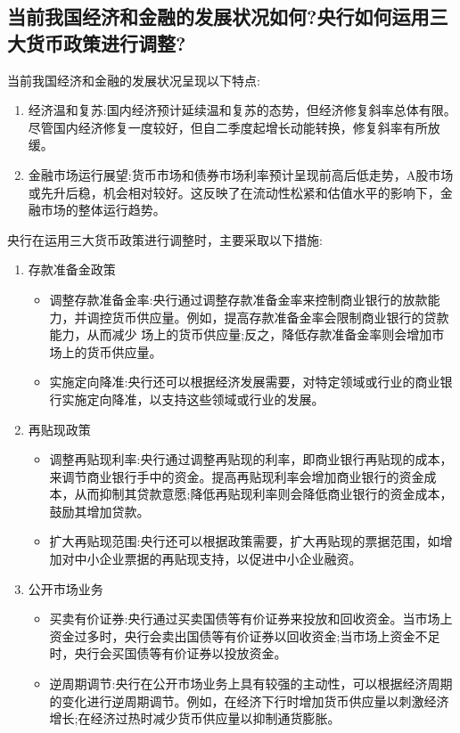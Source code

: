 \documentclass{article}
\begin{document}
\subsection{当前我国经济和金融的发展状况如何?央行如何运用三大货币政策进行调整?}

\noindent 当前我国经济和金融的发展状况呈现以下特点:
\begin{enumerate}
	\item 经济温和复苏:国内经济预计延续温和复苏的态势，但经济修复斜率总体有限。尽管国内经济修复一度较好，但自二季度起增长动能转换，修复斜率有所放缓。
	\item 金融市场运行展望:货币市场和债券市场利率预计呈现前高后低走势，A股市场或先升后稳，机会相对较好。这反映了在流动性松紧和估值水平的影响下，金融市场的整体运行趋势。
\end{enumerate}

\noindent 央行在运用三大货币政策进行调整时，主要采取以下措施:
\begin{enumerate}
	\item  存款准备金政策
	\begin{itemize}
		\item 调整存款准备金率:央行通过调整存款准备金率来控制商业银行的放款能力，并调控货币供应量。例如，提高存款准备金率会限制商业银行的贷款能力，从而减少 场上的货币供应量;反之，降低存款准备金率则会增加市场上的货币供应量。
    	\item 实施定向降准:央行还可以根据经济发展需要，对特定领域或行业的商业银行实施定向降准，以支持这些领域或行业的发展。
	\end{itemize}
  
	\item 再贴现政策
	\begin{itemize}
		\item 调整再贴现利率:央行通过调整再贴现的利率，即商业银行再贴现的成本，来调节商业银行手中的资金。提高再贴现利率会增加商业银行的资金成本，从而抑制其贷款意愿;降低再贴现利率则会降低商业银行的资金成本，鼓励其增加贷款。
		\item 扩大再贴现范围:央行还可以根据政策需要，扩大再贴现的票据范围，如增加对中小企业票据的再贴现支持，以促进中小企业融资。
	\end{itemize}

	\item 公开市场业务
	\begin{itemize}
    	\item 买卖有价证券:央行通过买卖国债等有价证券来投放和回收资金。当市场上资金过多时，央行会卖出国债等有价证券以回收资金;当市场上资金不足时，央行会买国债等有价证券以投放资金。
    	\item 逆周期调节:央行在公开市场业务上具有较强的主动性，可以根据经济周期的变化进行逆周期调节。例如，在经济下行时增加货币供应量以刺激经济增长;在经济过热时减少货币供应量以抑制通货膨胀。
	\end{itemize}
\end{enumerate}
\end{document}

